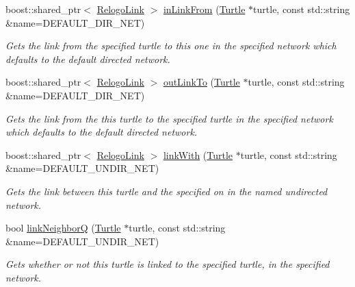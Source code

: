 \begin{DoxyCompactItemize}
boost\-::shared\-\_\-ptr$<$ \hyperlink{classrepast_1_1relogo_1_1_relogo_link}{Relogo\-Link} $>$ \hyperlink{classrepast_1_1relogo_1_1_turtle_a7a89ddb4f8c305fa5c70088939be3a8b}{in\-Link\-From} (\hyperlink{classrepast_1_1relogo_1_1_turtle}{Turtle} $\ast$turtle, const std\-::string \&name=D\-E\-F\-A\-U\-L\-T\-\_\-\-D\-I\-R\-\_\-\-N\-E\-T)
\begin{DoxyCompactList}\small\item\em Gets the link from the specified turtle to this one in the specified network which defaults to the default directed network. \end{DoxyCompactList}\item 
boost\-::shared\-\_\-ptr$<$ \hyperlink{classrepast_1_1relogo_1_1_relogo_link}{Relogo\-Link} $>$ \hyperlink{classrepast_1_1relogo_1_1_turtle_aa2761c7ccf88789dddfe2819328c2f8d}{out\-Link\-To} (\hyperlink{classrepast_1_1relogo_1_1_turtle}{Turtle} $\ast$turtle, const std\-::string \&name=D\-E\-F\-A\-U\-L\-T\-\_\-\-D\-I\-R\-\_\-\-N\-E\-T)
\begin{DoxyCompactList}\small\item\em Gets the link from the this turtle to the specified turtle in the specified network which defaults to the default directed network. \end{DoxyCompactList}\item 
boost\-::shared\-\_\-ptr$<$ \hyperlink{classrepast_1_1relogo_1_1_relogo_link}{Relogo\-Link} $>$ \hyperlink{classrepast_1_1relogo_1_1_turtle_a7b190bd765f3d44bba572eb755522b25}{link\-With} (\hyperlink{classrepast_1_1relogo_1_1_turtle}{Turtle} $\ast$turtle, const std\-::string \&name=D\-E\-F\-A\-U\-L\-T\-\_\-\-U\-N\-D\-I\-R\-\_\-\-N\-E\-T)
\begin{DoxyCompactList}\small\item\em Gets the link between this turtle and the specified on in the named undirected network. \end{DoxyCompactList}\item 
bool \hyperlink{classrepast_1_1relogo_1_1_turtle_a7b0286279994c4c4a307df7b84ecc229}{link\-Neighbor\-Q} (\hyperlink{classrepast_1_1relogo_1_1_turtle}{Turtle} $\ast$turtle, const std\-::string \&name=D\-E\-F\-A\-U\-L\-T\-\_\-\-U\-N\-D\-I\-R\-\_\-\-N\-E\-T)
\begin{DoxyCompactList}\small\item\em Gets whether or not this turtle is linked to the specified turtle, in the specified network. \end{DoxyCompactList}\item 

\end{DoxyCompactItemize}
